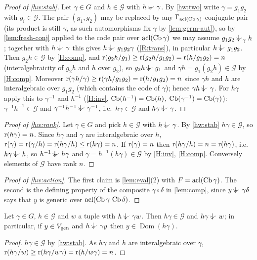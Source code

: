 \begin{proof}[Proof of \ref{hw:stab}]
Let $\gamma\in G$ and $h\in\mathcal G$ with $h\ind{}\gamma$.  By \ref{hw:two} write
$\gamma=g_1g_2$ with $g_i\in\mathcal G$.  The pair $(g_1,g_2)$ may be replaced by any
$\Gamma_{\operatorname{acl}(\operatorname{Cb}\gamma)}$-conjugate pair (its product is still $\gamma$, as such
automorphisms fix $\gamma$ by \cref{lem:germ-aut}), so by \cref{lem:fresh-conj} applied
to the code pair over $\operatorname{acl}(\operatorname{Cb}\gamma)$ we may assume
$g_1g_2\ind{\gamma}h$; together with $h\ind{}\gamma$ this gives $h\ind{}g_1g_2\gamma$
(\ref{R:trans}), in particular $h\ind{}g_1g_2$.  Then $g_2h\in\mathcal G$ by \ref{H:comp}, and
$\operatorname{r}(g_2h/g_1)\ge\operatorname{r}(g_2h/g_1g_2)=\operatorname{r}(h/g_1g_2)=n$ (interalgebraicity of $g_2h$ and $h$
over $g_2$), so $g_2h\ind{}g_1$ and $\gamma h=g_1(g_2h)\in\mathcal G$ by \ref{H:comp}.
Moreover $\operatorname{r}(\gamma h/\gamma)\ge\operatorname{r}(\gamma h/g_1g_2)=\operatorname{r}(h/g_1g_2)=n$ since $\gamma h$ and
$h$ are interalgebraic over $g_1g_2$ (which contains the code of $\gamma$); hence
$\gamma h\ind{}\gamma$.  For $h\gamma$ apply this to $\gamma^{-1}$ and $h^{-1}$
(\ref{H:inv}, $\operatorname{Cb}(h^{-1})=\operatorname{Cb}(h)$, $\operatorname{Cb}(\gamma^{-1})=\operatorname{Cb}(\gamma)$): $\gamma^{-1}h^{-1}\in\mathcal G$
and $\gamma^{-1}h^{-1}\ind{}\gamma^{-1}$, i.e.\ $h\gamma\in\mathcal G$ and $h\gamma\ind{}\gamma$.
\end{proof}

\begin{proof}[Proof of \ref{hw:rank}]
Let $\gamma\in G$ and pick $h\in\mathcal G$ with $h\ind{}\gamma$.  By \ref{hw:stab}
$h\gamma\in\mathcal G$, so $\operatorname{r}(h\gamma)=n$.  Since $h\gamma$ and $\gamma$ are interalgebraic
over $h$, $\operatorname{r}(\gamma)=\operatorname{r}(\gamma/h)=\operatorname{r}(h\gamma/h)\le\operatorname{r}(h\gamma)=n$.  If $\operatorname{r}(\gamma)=n$ then
$\operatorname{r}(h\gamma/h)=n=\operatorname{r}(h\gamma)$, i.e.\ $h\gamma\ind{}h$, so $h^{-1}\ind{}h\gamma$ and
$\gamma=h^{-1}(h\gamma)\in\mathcal G$ by \ref{H:inv}, \ref{H:comp}.  Conversely elements
of $\mathcal G$ have rank $n$.
\end{proof}

\begin{proof}[Proof of \ref{hw:action}]
The first claim is \cref{lem:eval}(2) with $F=\operatorname{acl}(\operatorname{Cb}\gamma)$.  The second is the
defining property of the composite $\gamma\circ\delta$ in \cref{lem:comp}, since
$y\ind{}\gamma\delta$ says that $y$ is generic over $\operatorname{acl}(\operatorname{Cb}\gamma\,\operatorname{Cb}\delta)$.
\end{proof}

\begin{lemma}\label{lem:keyrank}
Let $\gamma\in G$, $h\in\mathcal G$ and $w$ a tuple with $h\ind{}\gamma w$.  Then
$h\gamma\in\mathcal G$ and $h\gamma\ind{}w$; in particular, if $y\in V_{\operatorname{gen}}$ and
$h\ind{}\gamma y$ then $y\in\operatorname{Dom}(h\gamma)$.
\end{lemma}
\begin{proof}
$h\gamma\in\mathcal G$ by \ref{hw:stab}.  As $h\gamma$ and $h$ are interalgebraic over
$\gamma$, $\operatorname{r}(h\gamma/w)\ge\operatorname{r}(h\gamma/w\gamma)=\operatorname{r}(h/w\gamma)=n$.
\end{proof}

